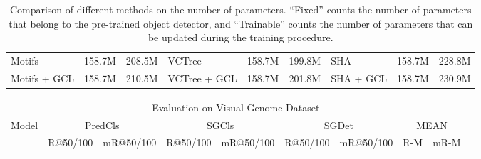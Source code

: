 \documentclass[10pt,twocolumn,letterpaper]{article}
\begin{document}
{\begin{table*}[t]
\begin{tabular}{p{2.0cm}<{\centering}p{1.1cm}<{\centering}p{1.1cm}<{\centering}|p{2.0cm}<{\centering}p{1.1cm}<{\centering}p{1.1cm}<{\centering}|p{2.0cm}<{\centering}|p{1.1cm}<{\centering}p{1.1cm}}
		Motifs  & 158.7M & 208.5M & VCTree & 158.7M & 199.8M & SHA & 158.7M & 228.8M \\ 
		Motifs + GCL  & 158.7M & 210.5M & VCTree + GCL & 158.7M & 201.8M & SHA + GCL & 158.7M & 230.9M \\  \hline
		
	\end{tabular}
	\caption{Comparison of different methods on the number of parameters.       ``Fixed'' counts the number of parameters that belong to the pre-trained object detector, and ``Trainable'' counts the number of parameters that can be updated during the training procedure.}
	\label{para_counts}
	\vspace{0.1cm}
\end{table*}

\begin{table*}[t]
	\small
	\begin{tabular}{p{3.2cm}|p{1.4cm}<{\centering}p{1.4cm}<{\centering}|p{1.4cm}<{\centering}p{1.4cm}<{\centering}|p{1.4cm}<{\centering}p{1.4cm}<{\centering}|p{0.5cm}<{\centering}p{0.5cm}}
		\hline
\multicolumn{9}{c}{\multirow{2}{*}{Evaluation on Visual Genome Dataset}}\\
		\multicolumn{9}{c}{}\\
		\hline
		\multicolumn{1}{c|}{\multirow{2}{*}{Model}} & \multicolumn{2}{c|}{PredCls}& \multicolumn{2}{c|}{SGCls}& \multicolumn{2}{c|}{SGDet}& \multicolumn{2}{c}{MEAN}\\ \cline{2-9} 
		\multicolumn{1}{c|}{}& \multicolumn{1}{c}{R@50/100} & \multicolumn{1}{c|}{mR@50/100} & \multicolumn{1}{c}{R@50/100} & \multicolumn{1}{c|}{mR@50/100} & \multicolumn{1}{c}{R@50/100} & \multicolumn{1}{c|}{mR@50/100} & \multicolumn{1}{c}{R-M} & \multicolumn{1}{c}{mR-M}\\ \hline
		

\end{tabular}
\end{table*}}
\end{document}
